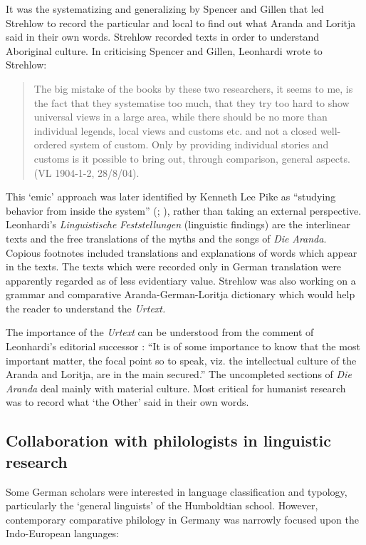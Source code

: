 \documentclass[english,output=paper,colorlinks,citecolor=brown]{../langscibook}
\begin{document}
It was the systematizing and generalizing by Spencer and Gillen that led Strehlow to record the particular and local to find out what Aranda and Loritja said in their own words. Strehlow recorded texts in order to understand Aboriginal culture. In criticising Spencer and Gillen, Leonhardi wrote to Strehlow:

\begin{quote}
    The big mistake of the books by these two researchers, it seems to me, is the fact that they systematise too much, that they try too hard to show universal views in a large area, while there should be no more than individual legends, local views and customs etc. and not a closed well-ordered system of custom. Only by providing individual stories and customs is it possible to bring out, through comparison, general aspects. (VL 1904-1-2, 28/8/04).
\end{quote}

This ‘emic’ approach was later identified by Kenneth Lee Pike as “studying behavior from inside the system” (\citealt[37]{Pike1967}; \citealt[542]{Bolinger1975}), rather than taking an external perspective. Leonhardi’s \textit{Linguistische} \textit{Feststellungen} (linguistic findings) are the interlinear texts and the free translations of the myths and the songs of \textit{Die} \textit{Aranda}. Copious footnotes included translations and explanations of words which appear in the texts. The texts which were recorded only in German translation were apparently regarded as of less evidentiary value. Strehlow was also working on a grammar and comparative Aranda-German-Loritja dictionary which would help the reader to understand the \textit{Urtext.} 

The importance of the \textit{Urtext} can be understood from the comment of Leonhardi’s editorial successor \citet[285]{Hagen1991}: “It is of some importance to know that the most important matter, the focal point so to speak, viz. the intellectual culture of the Aranda and Loritja, are in the main secured.” The uncompleted sections of \textit{Die} \textit{Aranda} deal mainly with material culture. Most critical for humanist research was to record what ‘the Other’ said in their own words.

\subsection{Collaboration with philologists in linguistic research} 

Some German scholars were interested in language classification and typology, particularly the ‘general linguists’ of the Humboldtian school. However, contemporary comparative philology in Germany was narrowly focused upon the Indo-European languages:
\end{document}
